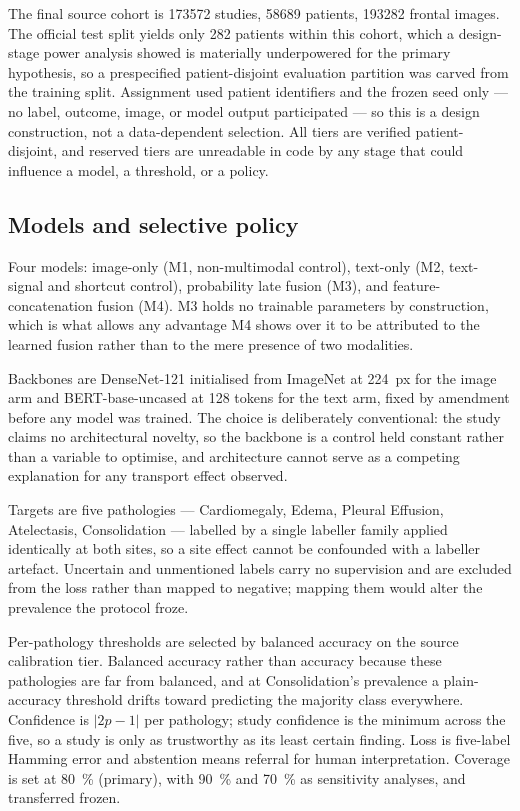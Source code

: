 The final source cohort is \num{173572} studies, \num{58689} patients,
\num{193282} frontal images. The official test split yields only \num{282}
patients within this cohort, which a design-stage power analysis showed is
materially underpowered for the primary hypothesis, so a prespecified
patient-disjoint evaluation partition was carved from the training split.
Assignment used patient identifiers and the frozen seed only --- no label,
outcome, image, or model output participated --- so this is a design
construction, not a data-dependent selection. All tiers are verified
patient-disjoint, and reserved tiers are unreadable in code by any stage that
could influence a model, a threshold, or a policy.

\subsection{Models and selective policy}

Four models: image-only (M1, non-multimodal control), text-only (M2,
text-signal and shortcut control), probability late fusion (M3), and
feature-concatenation fusion (M4). M3 holds no trainable parameters by
construction, which is what allows any advantage M4 shows over it to be
attributed to the learned fusion rather than to the mere presence of two
modalities.

Backbones are DenseNet-121 initialised from ImageNet at \SI{224}{px} for the
image arm and BERT-base-uncased at 128 tokens for the text arm, fixed by
amendment before any model was trained. The choice is deliberately conventional:
the study claims no architectural novelty, so the backbone is a control held
constant rather than a variable to optimise, and architecture cannot serve as a
competing explanation for any transport effect observed.

Targets are five pathologies --- Cardiomegaly, Edema, Pleural Effusion,
Atelectasis, Consolidation --- labelled by a single labeller family applied
identically at both sites, so a site effect cannot be confounded with a labeller
artefact. Uncertain and unmentioned labels carry no supervision and are excluded
from the loss rather than mapped to negative; mapping them would alter the
prevalence the protocol froze.

Per-pathology thresholds are selected by balanced accuracy on the source
calibration tier. Balanced accuracy rather than accuracy because these
pathologies are far from balanced, and at Consolidation's prevalence a
plain-accuracy threshold drifts toward predicting the majority class
everywhere. Confidence is $\lvert 2p-1 \rvert$ per pathology; study confidence
is the minimum across the five, so a study is only as trustworthy as its least
certain finding. Loss is five-label Hamming error and abstention means referral
for human interpretation. Coverage is set at \SI{80}{\percent} (primary), with
\SI{90}{\percent} and \SI{70}{\percent} as sensitivity analyses, and transferred
frozen.

